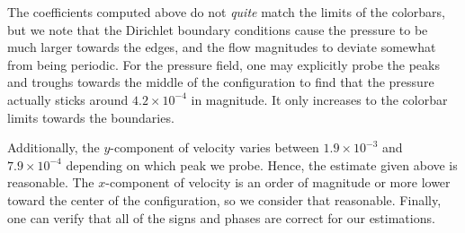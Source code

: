 \documentclass[reqno]{article}
\begin{document}
The coefficients computed above do not \textit{quite} match the limits of the
colorbars, but we note that the Dirichlet boundary conditions cause the pressure
to be much larger towards the edges, and the flow magnitudes to deviate somewhat
from being periodic.
For the pressure field, one may explicitly probe the peaks and troughs towards
the middle of the configuration to find that the pressure actually sticks around 
$4.2 \times 10^{-4}$ in magnitude.
It only increases to the colorbar limits towards the boundaries.

Additionally, the $y$-component of velocity varies between $1.9 \times 10^{-3}$
and $7.9 \times 10^{-4}$ depending on which peak we probe.
Hence, the estimate given above is reasonable.
The $x$-component of velocity is an order of magnitude or more lower toward the center
of the configuration, so we consider that reasonable.
Finally, one can verify that all of the signs and phases are correct for our
estimations.
\end{document}
